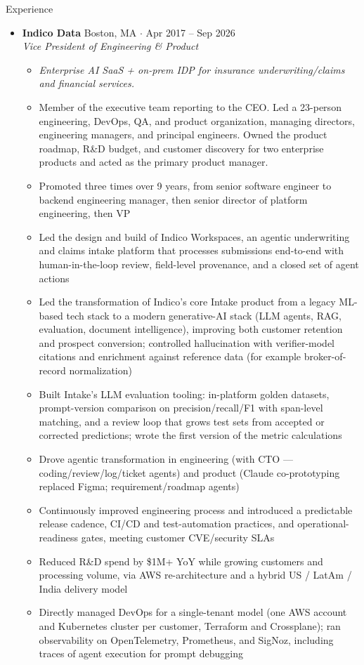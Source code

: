 \documentclass[10pt,oneside]{article}
\newenvironment{ressection}[1]{
  \vspace{4pt}
  {\fontfamily{phv}\selectfont\Large#1}
  \begin{itemize}
    \vspace{3pt}
}{
  \end{itemize}
}
\newcommand{\ressubitem}[1]{
  \vspace{-1pt}
\item \begin{flushleft} #1 \end{flushleft}
}
\newcommand{\rescontext}[1]{
  \vspace{-3pt}
\item[] \begin{flushleft} \textit{\small #1} \end{flushleft}
}
\newcommand{\resscope}[1]{
  \vspace{-3pt}
\item[] \begin{flushleft} #1 \end{flushleft}
}
\newcommand{\resbigitem}[3]{
  \vspace{-5pt}
\item
  \textbf{#1} \hfill #2 \\
  \textit{#3}
}
\newenvironment{ressubsec}[3]{
  \resbigitem{#1}{#2}{#3}
  \vspace{-2pt}
  \begin{itemize}
}{
  \end{itemize}
}
\begin{document}
\begin{ressection}{Experience}

  \begin{ressubsec}{Indico Data}{Boston, MA \; $\cdot$ \; Apr 2017 -- Sep 2026}{Vice President of Engineering \& Product}
    \rescontext{Enterprise AI SaaS + on-prem IDP for insurance underwriting/claims and financial services.}
    \resscope{Member of the executive team reporting to the CEO. Led a 23-person engineering, DevOps, QA, and product organization, managing directors, engineering managers, and principal engineers. Owned the product roadmap, R\&D budget, and customer discovery for two enterprise products and acted as the primary product manager.}
    \ressubitem{Promoted three times over 9 years, from senior software engineer to backend engineering manager, then senior director of platform engineering, then VP}
    \ressubitem{Led the design and build of Indico Workspaces, an agentic underwriting and claims intake platform that processes submissions end-to-end with human-in-the-loop review, field-level provenance, and a closed set of agent actions}
    \ressubitem{Led the transformation of Indico's core Intake product from a legacy ML-based tech stack to a modern generative-AI stack (LLM agents, RAG, evaluation, document intelligence), improving both customer retention and prospect conversion; controlled hallucination with verifier-model citations and enrichment against reference data (for example broker-of-record normalization)}
    \ressubitem{Built Intake's LLM evaluation tooling: in-platform golden datasets, prompt-version comparison on precision/recall/F1 with span-level matching, and a review loop that grows test sets from accepted or corrected predictions; wrote the first version of the metric calculations}
    \ressubitem{Drove agentic transformation in engineering (with CTO --- coding/review/log/ticket agents) and product (Claude co-prototyping replaced Figma; requirement/roadmap agents)}
    \ressubitem{Continuously improved engineering process and introduced a predictable release cadence, CI/CD and test-automation practices, and operational-readiness gates, meeting customer CVE/security SLAs}
    \ressubitem{Reduced R\&D spend by \$1M+ YoY while growing customers and processing volume, via AWS re-architecture and a hybrid US / LatAm / India delivery model}
    \ressubitem{Directly managed DevOps for a single-tenant model (one AWS account and Kubernetes cluster per customer, Terraform and Crossplane); ran observability on OpenTelemetry, Prometheus, and SigNoz, including traces of agent execution for prompt debugging}

\end{ressubsec}
\end{ressection}
\end{document}
